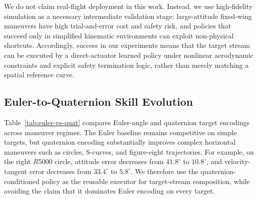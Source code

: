 \documentclass{article}
\begin{document}
We do not claim real-flight deployment in this work.
Instead, we use high-fidelity simulation as a necessary intermediate validation stage: large-attitude fixed-wing maneuvers have high trial-and-error cost and safety risk, and policies that succeed only in simplified kinematic environments can exploit non-physical shortcuts.
Accordingly, success in our experiments means that the target stream can be executed by a direct-actuator learned policy under nonlinear aerodynamic constraints and explicit safety termination logic, rather than merely matching a spatial reference curve.


\subsection{Euler-to-Quaternion Skill Evolution}

Table~\ref{tab:euler-vs-quat} compares Euler-angle and quaternion target encodings across maneuver regimes.
The Euler baseline remains competitive on simple targets, but quaternion encoding substantially improves complex horizontal maneuvers such as circles, S-curves, and figure-eight trajectories.
For example, on the right $R5000$ circle, attitude error decreases from $41.8^\circ$ to $10.8^\circ$, and velocity-tangent error decreases from $33.4^\circ$ to $5.8^\circ$.
We therefore use the quaternion-conditioned policy as the reusable executor for target-stream composition, while avoiding the claim that it dominates Euler encoding on every target.
\end{document}
